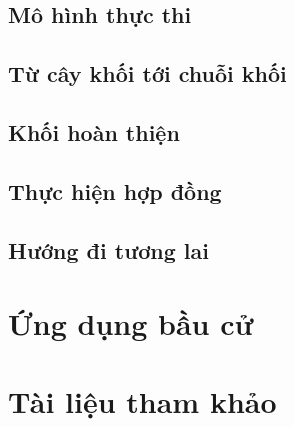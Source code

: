 \documentclass[12pt]{article}
\begin{document}
		\subsection{Mô hình thực thi}
				
		
		\subsection{Từ cây khối tới chuỗi khối}
		
		
		\subsection{Khối hoàn thiện}
		
		
		\subsection{Thực hiện hợp đồng}
		
		
		\subsection{Hướng đi tương lai}
			
	
	\newpage
	\section{Ứng dụng bầu cử}
	
	
	\section{Tài liệu tham khảo}
	
\end{document}
